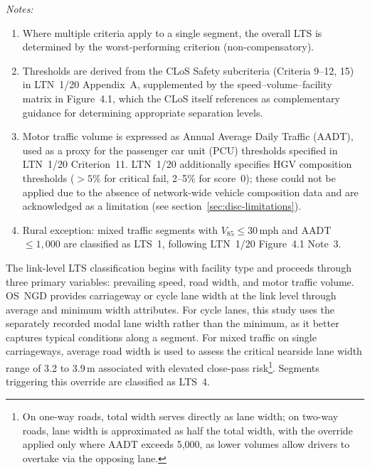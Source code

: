 \begin{table}[h]
\vspace{0.5em}
\footnotesize
\noindent\textit{Notes:}
\begin{enumerate}[nosep, leftmargin=*, label=\arabic*.]
    \item Where multiple criteria apply to a single segment, the overall LTS is determined by the worst-performing criterion (non-compensatory).
    \item Thresholds are derived from the CLoS Safety subcriteria (Criteria 9--12, 15) in LTN~1/20 Appendix~A, supplemented by the speed--volume--facility matrix in Figure~4.1, which the CLoS itself references as complementary guidance for determining appropriate separation levels.
    \item Motor traffic volume is expressed as Annual Average Daily Traffic (AADT), used as a proxy for the passenger car unit (PCU) thresholds specified in LTN~1/20 Criterion~11. LTN~1/20 additionally specifies HGV composition thresholds ($>5\%$ for critical fail, 2--5\% for score~0); these could not be applied due to the absence of network-wide vehicle composition data and are acknowledged as a limitation (see section~\ref{sec:disc-limitations}).
    \item Rural exception: mixed traffic segments with $V_{85} \leq 30$\,mph and AADT $\leq 1{,}000$ are classified as LTS~1, following LTN~1/20 Figure~4.1 Note~3.
\end{enumerate}
\end{table}
\renewcommand{\arraystretch}{1.0}

The link-level LTS classification begins with facility type and proceeds through three primary variables: prevailing speed, road width, and motor traffic volume. OS~NGD provides carriageway or cycle lane width at the link level through average and minimum width attributes. For cycle lanes, this study uses the separately recorded modal lane width rather than the minimum, as it better captures typical conditions along a segment. For mixed traffic on single carriageways, average road width is used to assess the critical nearside lane width range of 3.2 to 3.9\,m associated with elevated close-pass risk\footnote{On one-way roads, total width serves directly as lane width; on two-way roads, lane width is approximated as half the total width, with the override applied only where AADT exceeds 5,000, as lower volumes allow drivers to overtake via the opposing lane.}. Segments triggering this override are classified as LTS~4.

